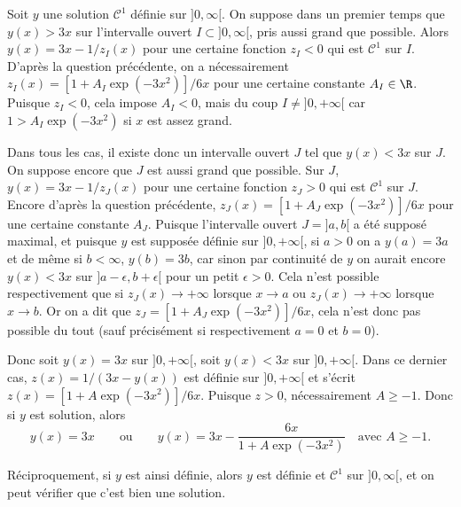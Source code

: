 {\begin{enumerate}
{    Soit $y$ une solution $\mathcal{C}^1$ définie sur $]0,\infty[$. On suppose dans un premier temps que $y(x) > 3x$ sur l'intervalle ouvert $I \subset ]0,\infty[$, pris aussi grand que possible.  Alors $y(x) = 3x - 1/{z_I(x)}$ pour une certaine fonction $z_I < 0$ qui est $\mathcal{C}^1$ sur $I$. D'après la question précédente, on a nécessairement $z_I(x) = [1+A_I\exp(-3x^2)]/6x$ pour une certaine constante $A_I \in \R$. Puisque $z_I < 0$, cela impose $A_I<0$, mais du coup $I \neq ]0,+\infty[$ car $1 > A_I\exp(-3x^2)$ si $x$ est assez grand.
  
  Dans tous les cas, il existe donc un intervalle ouvert $J$ tel que $y(x) < 3x$ sur $J$. On suppose encore que $J$ est aussi grand que possible. Sur $J$, $y(x) = 3x - 1/{z_J(x)}$ pour une certaine fonction $z_J > 0$ qui est $\mathcal{C}^1$ sur $J$. Encore d'après la question précédente, $z_J(x) = [1+A_J\exp(-3x^2)]/6x$ pour une certaine constante $A_J$.
 Puisque l'intervalle ouvert $J = ]a,b[$ a été supposé maximal, et puisque $y$ est supposée définie sur $]0,+\infty[$, si $a > 0$ on a $y(a) = 3a$ et de même si $b < \infty$, $y(b) = 3b$, car sinon par continuité de $y$ on aurait encore $y(x) < 3x$ sur $]a-\epsilon,b+\epsilon[$ pour un petit $\epsilon > 0$. Cela n'est possible respectivement que si $z_J(x) \rightarrow +\infty$ lorsque $x \rightarrow a$ ou $z_J(x) \rightarrow +\infty$ lorsque $x \rightarrow b$. Or on a dit que $z_J = [1+A_J\exp(-3x^2)]/6x$, cela n'est donc pas possible du tout (sauf précisément si respectivement $a =0$ et $b=0$).
  
  Donc soit $y(x) = 3x$ sur $]0,+\infty[$, soit $y(x) < 3x$ sur $]0,+\infty[$. Dans ce dernier cas, $z(x) = 1/(3x-y(x))$ est définie sur $]0,+\infty[$ et s'écrit $z(x) = [1+A\exp(-3x^2)]/6x$. Puisque $z > 0$, nécessairement $A \geq -1$. Donc si $y$ est solution, alors     
    \[ y(x) = 3x \qquad \text{ou} \qquad y(x) =  3x - \frac{6x}{1+A\exp(-3x^2)} \quad \text{avec } A \geq -1.\]
    
 Réciproquement, si $y$ est ainsi définie, alors $y$ est définie et $\mathcal{C}^1$ sur $]0,\infty[$, et on peut vérifier que c'est bien une solution.}
\end{enumerate}
}